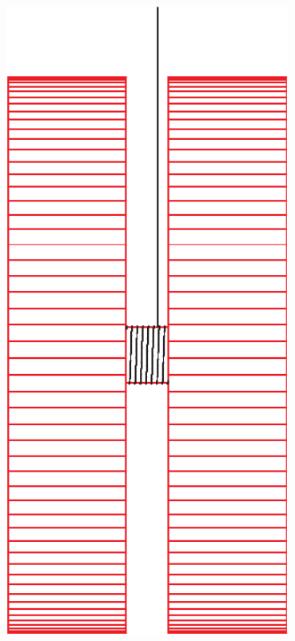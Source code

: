 \documentclass[12pt]{article}
\begin{document}
\begin{minipage}{0.20\textwidth}
	\begin{center}
	\includegraphics[width=0.7\textwidth]{red-crop.pdf}
	\end{center}
\end{minipage}
\end{document}
